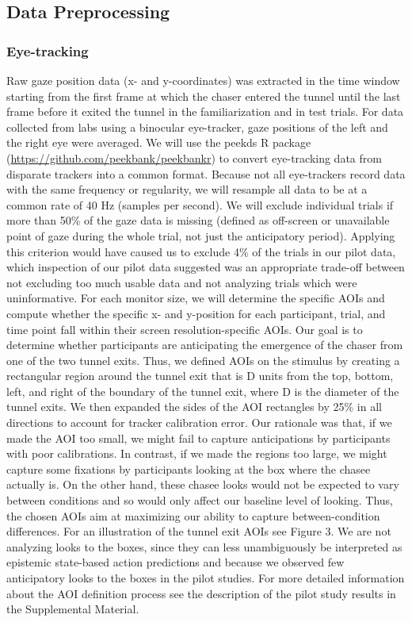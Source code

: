 \documentclass[
  man,floatsintext]{apa6}
\begin{document}
\subsection{Data Preprocessing}\label{data-preprocessing}

\subsubsection{Eye-tracking}\label{eye-tracking}

Raw gaze position data (x- and y-coordinates) was extracted in the time window starting from the first frame at which the chaser entered the tunnel until the last frame before it exited the tunnel in the familiarization and in test trials. For data collected from labs using a binocular eye-tracker, gaze positions of the left and the right eye were averaged.
We will use the peekds R package (\url{https://github.com/peekbank/peekbankr}) to convert eye-tracking data from disparate trackers into a common format. Because not all eye-trackers record data with the same frequency or regularity, we will resample all data to be at a common rate of 40 Hz (samples per second).
We will exclude individual trials if more than 50\% of the gaze data is missing (defined as off-screen or unavailable point of gaze during the whole trial, not just the anticipatory period). Applying this criterion would have caused us to exclude 4\% of the trials in our pilot data, which inspection of our pilot data suggested was an appropriate trade-off between not excluding too much usable data and not analyzing trials which were uninformative.
For each monitor size, we will determine the specific AOIs and compute whether the specific x- and y-position for each participant, trial, and time point fall within their screen resolution-specific AOIs. Our goal is to determine whether participants are anticipating the emergence of the chaser from one of the two tunnel exits. Thus, we defined AOIs on the stimulus by creating a rectangular region around the tunnel exit that is D units from the top, bottom, left, and right of the boundary of the tunnel exit, where D is the diameter of the tunnel exits. We then expanded the sides of the AOI rectangles by 25\% in all directions to account for tracker calibration error. Our rationale was that, if we made the AOI too small, we might fail to capture anticipations by participants with poor calibrations. In contrast, if we made the regions too large, we might capture some fixations by participants looking at the box where the chasee actually is. On the other hand, these chasee looks would not be expected to vary between conditions and so would only affect our baseline level of looking. Thus, the chosen AOIs aim at maximizing our ability to capture between-condition differences. For an illustration of the tunnel exit AOIs see Figure 3. We are not analyzing looks to the boxes, since they can less unambiguously be interpreted as epistemic state-based action predictions and because we observed few anticipatory looks to the boxes in the pilot studies. For more detailed information about the AOI definition process see the description of the pilot study results in the Supplemental Material.
\end{document}
